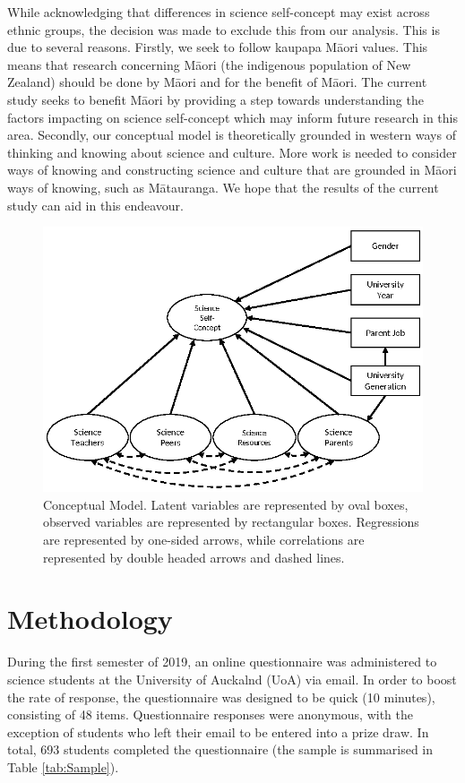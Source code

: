 While acknowledging that differences in science self-concept may exist across ethnic groups, the decision was made to exclude this from our analysis. This is due to several reasons. Firstly, we seek to follow kaupapa M\={a}ori values. This means that research concerning M\={a}ori (the indigenous population of New Zealand) should be done by M\={a}ori and for the benefit of M\={a}ori. \cite{walker2006exploration} The current study seeks to benefit M\={a}ori by providing a step towards understanding the factors impacting on science self-concept which may inform future research in this area. Secondly, our conceptual model is theoretically grounded in western ways of thinking and knowing about science and culture. More work is needed to consider ways of knowing and constructing science and culture that are grounded in M\={a}ori ways of knowing, such as M\={a}tauranga. \cite{hikuroa2017matauranga} We hope that the results of the current study can aid in this endeavour. 
\begin{figure}
 \includegraphics{ConceptualModel.eps}
\caption{Conceptual Model. Latent variables are represented by oval boxes, observed variables are represented by rectangular boxes. Regressions are represented by one-sided arrows, while correlations are represented by double headed arrows and dashed lines. }
\label{fig:1}       
\end{figure}

\section*{Methodology}
\label{method}
During the first semester of 2019, an online questionnaire was administered to science students at the University of Auckalnd (UoA) via email. In order to boost the rate of response, the questionnaire was designed to be quick (10 minutes), consisting of 48 items. Questionnaire responses were anonymous, with the exception of students who left their email to be entered into a prize draw. In total, 693 students completed the questionnaire (the sample is summarised in Table \ref{tab:Sample}). 


